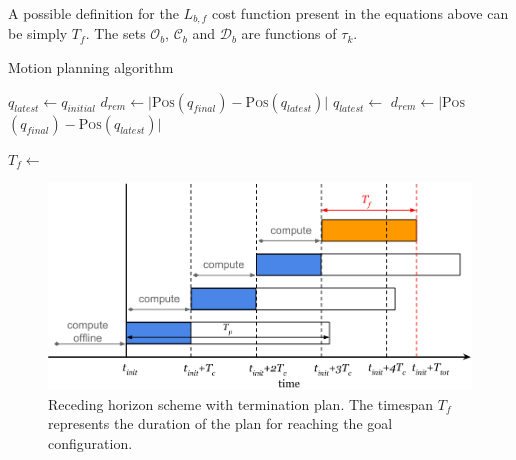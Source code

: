 \documentclass[eprint]{actapoly}
\begin{document}
A possible definition for the $L_{b,f}$ cost function present in the equations above can be simply $T_f$.
The sets $\mathcal{O}_b$, $\mathcal{C}_b$ and $\mathcal{D}_b$ are functions of
$\tau_k$.

\begin{algorithm}
    \caption{Motion planning algorithm\label{cod:algo}}
    \label{swpa}
    \begin{algorithmic}[1] %
	    \State $q_{latest} \gets q_{initial}$
	    \State $d_{rem} \gets |${\scshape Pos}$(q_{final}) - ${\scshape Pos}$(q_{latest})|$
	    \State {}
		\State $q_{latest} \gets $
		\State $d_{rem} \gets |${\scshape Pos}$(q_{final}) - ${\scshape Pos}$(q_{latest})|$
		
	    \EndWhile\label{planningwhile}
	    \State {}
	    \State $T_f \gets $
	    
        \EndProcedure
    \end{algorithmic}
\end{algorithm}

\begin{figure}[!h]
  \centering
  \includegraphics[width=\linewidth]{./images/receding_horizon/recedinghorizon2.png} %
  \caption{Receding horizon scheme with termination plan. The timespan $T_f$ represents the duration of the plan for reaching the goal configuration.\label{fig:recedinghor}}
\end{figure}
\end{document}
